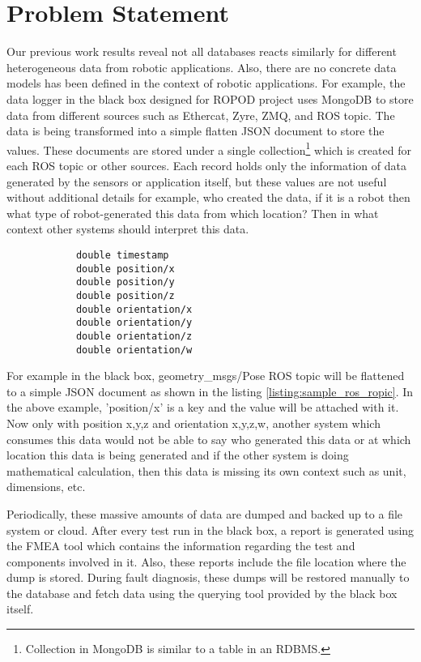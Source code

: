 

	\let\cleardoublepage\clearpage
\chapter{Problem Statement} \label{sec:problem_statement}
Our previous work results reveal not all databases reacts similarly for different heterogeneous data from robotic applications. Also, there are no concrete data models has been defined in the context of robotic applications. For example, the data logger in the black box designed for ROPOD project uses MongoDB to store data from different sources such as Ethercat, Zyre, ZMQ, and ROS topic. The data is being transformed into a simple flatten JSON document to store the values. These documents are stored under a single collection\footnote{Collection in MongoDB is similar to a table in an RDBMS.} which is created for each ROS topic or other sources. Each record holds only the information of data generated by the sensors or application itself, but these values are not useful without additional details for example, who created the data, if it is a robot then what type of robot-generated this data from which location? Then in what context other systems should interpret this data.

\begin{center} \label{listing:sample_ros_ropic}
	\lstset{%
		caption=geometry\_msgs/Pose ROS topic,
		basicstyle=\ttfamily\footnotesize\bfseries,
		frame=tb
	}
\begin{lstlisting}
			double timestamp
			double position/x
			double position/y
			double position/z
			double orientation/x
			double orientation/y
			double orientation/z
			double orientation/w
\end{lstlisting}
\end{center}

For example in the black box, geometry\_msgs/Pose ROS topic will be flattened to a simple JSON document as shown in the listing \ref{listing:sample_ros_ropic}. In the above example, 'position/x' is a key and the value will be attached with it. Now only with position x,y,z and orientation x,y,z,w, another system which consumes this data would not be able to say who generated this data or at which location this data is being generated and if the other system is doing mathematical calculation, then this data is missing its own context such as unit, dimensions, etc.

Periodically, these massive amounts of data are dumped and backed up to a file system or cloud. After every test run in the black box, a report is generated using the FMEA tool which contains the information regarding the test and components involved in it. Also, these reports include the file location where the dump is stored. During fault diagnosis, these dumps will be restored manually to the database and fetch data using the querying tool provided by the black box itself. 

